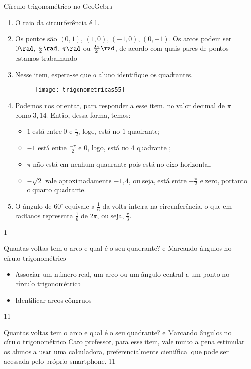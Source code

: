 \def\currentcolor{session2}
\begin{answer}{Círculo trigonométrico no GeoGebra}
{
	\begin{enumerate}
	\item O raio da circunferência é 1.
	\item  Os pontos são $(0,1)$, $(1,0)$, $(-1,0)$, $(0,-1)$. Os arcos podem ser $0\rad$, $\frac{\pi}{2}\rad$, $\pi\rad$ ou $\frac{3\pi}{2}\rad$, de acordo com quais pares de pontos estamos trabalhando.
	\item Nesse item, espera-se que o aluno identifique os quadrantes.
	\begin{figure}[H]
	\centering
	
	\texttt{[image: trigonometricas55]}
	\end{figure}

	\item Podemos nos orientar, para responder a esse item, no valor decimal de $\pi$ como $3{,}14$. Então, dessa forma, temos: 
	\begin{itemize}
	\item $1$ está entre $0$ e $\frac{\pi}{2}$, logo, está no $1$ quadrante;
	\item $-1$ está entre $\frac{-\pi}{2}$ e $0$, logo, está no $4$ quadrante ;
	\item $\pi$ não está em nenhum quadrante pois está no eixo horizontal. 
	\item $-\sqrt{2}$ vale aproximadamente $-1{,}4$, ou seja, está entre $-\frac{\pi}{2}$ e zero, portanto o quarto quadrante.
	\end{itemize}
	\item O ângulo de $60^{\circ}$ equivale a $\frac{1}{6}$ da volta inteira na circunferência, o que em radianos representa $\frac{1}{6}$ de $2\pi$, ou seja, $\frac{\pi}{3}$.
	\end{enumerate}
}{1}
\end{answer}
\clearmargin
\begin{objectives}{Quantas voltas tem o arco e qual é o seu quadrante?  e Marcando ângulos no círulo trigonométrico}
{
	\begin{itemize}
	\item Associar um número real, um arco ou um ângulo central a um ponto no círculo trigonométrico
	\item Identificar arcos côngruos
	\end{itemize}
}
{1}{1}
\end{objectives}
\begin{sugestions}{Quantas voltas tem o arco e qual é o seu quadrante?  e Marcando ângulos no círulo trigonométrico}
{
	Caro professor, para esse item, vale muito a pena estimular os alunos a usar uma calculadora, preferencialmente científica, que pode ser acessada pelo próprio smartphone.
}{1}{1}
\end{sugestions}

